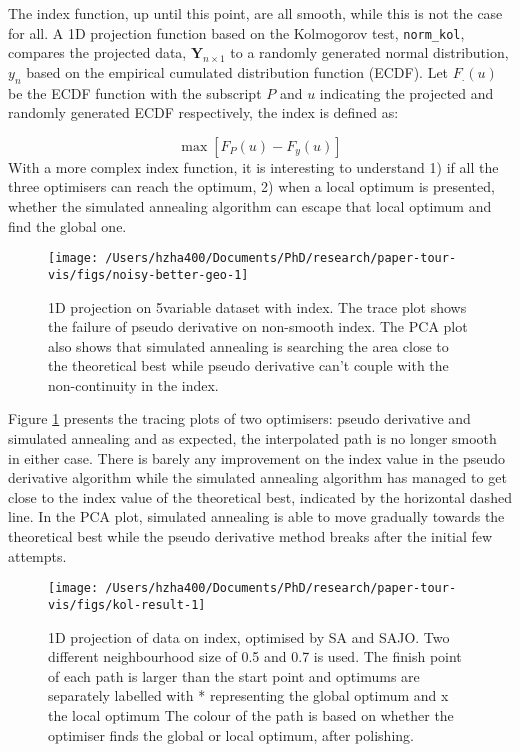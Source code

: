 The index function, up until this point, are all smooth, while this is
not the case for all. A 1D projection function based on the Kolmogorov
test, \texttt{norm\_kol}, compares the projected data,
\(\mathbf{Y}_{n \times 1}\) to a randomly generated normal distribution,
\(y_n\) based on the empirical cumulated distribution function (ECDF).
Let \(F_{.}(u)\) be the ECDF function with the subscript \(P\) and \(u\)
indicating the projected and randomly generated ECDF respectively, the
index is defined as:

\[\max \left[F_{P}(u) - F_{y}(u)\right]\] With a more complex index
function, it is interesting to understand 1) if all the three optimisers
can reach the optimum, 2) when a local optimum is presented, whether the
simulated annealing algorithm can escape that local optimum and find the
global one.

\begin{Schunk}
\begin{figure}
\texttt{[image: /Users/hzha400/Documents/PhD/research/paper-tour-vis/figs/noisy-better-geo-1]} \caption[1D projection on 5\-variable dataset  with  index]{1D projection on 5\-variable dataset  with  index. The trace plot shows the failure of pseudo derivative on non-smooth index. The PCA plot also shows that simulated annealing is searching the area close to the theoretical best while pseudo derivative can't couple with the non-continuity in the index.}\label{fig:noisy-better-geo}
\end{figure}
\end{Schunk}

Figure \ref{fig:noisy-better-geo} presents the tracing plots of two
optimisers: pseudo derivative and simulated annealing and as expected,
the interpolated path is no longer smooth in either case. There is
barely any improvement on the index value in the pseudo derivative
algorithm while the simulated annealing algorithm has managed to get
close to the index value of the theoretical best, indicated by the
horizontal dashed line. In the PCA plot, simulated annealing is able to
move gradually towards the theoretical best while the pseudo derivative
method breaks after the initial few attempts.

\begin{Schunk}
\begin{figure}
\texttt{[image: /Users/hzha400/Documents/PhD/research/paper-tour-vis/figs/kol-result-1]} \caption[1D projection of data  on  index,  optimised by SA and SAJO]{1D projection of data  on  index,  optimised by SA and SAJO. Two different neighbourhood size of 0.5 and 0.7 is used. The finish point of each path is larger than the start point and optimums are separately labelled with * representing the global optimum and x the local optimum The colour of the path is based on whether the optimiser finds the global or local optimum, after polishing.}\label{fig:kol-result}
\end{figure}
\end{Schunk}

